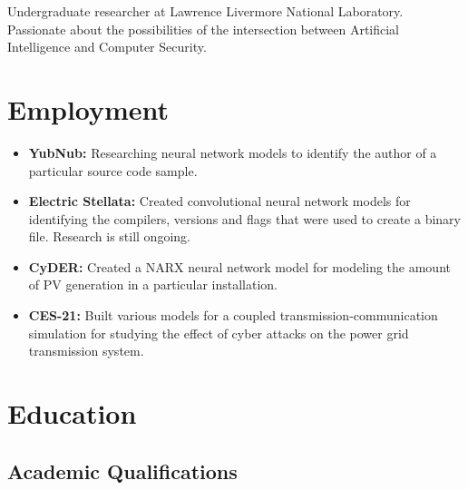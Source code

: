 \documentclass[11pt,a4paper,sans]{moderncv}        %
\begin{document}
\makecvtitle

\small{Undergraduate researcher at Lawrence Livermore National Laboratory. Passionate about the possibilities of the intersection between Artificial Intelligence and Computer Security.}

\section{Employment}
\vspace{6pt}

\vspace{5pt}

\begin{itemize}
	\item \textbf{YubNub:} Researching neural network models to identify the author of a particular source code sample. 

	\item \textbf{Electric Stellata:} Created convolutional neural network models for identifying the compilers, versions and flags that were used to create a binary file. Research is still ongoing.

	\item \textbf{CyDER:} Created a NARX neural network model for modeling the amount of PV generation in a particular installation.
	
	\item \textbf{CES-21:} Built various models for a coupled transmission-communication simulation for studying the effect of cyber attacks on the power grid transmission system.
\end{itemize}

\section{Education}
\vspace{6pt}

\subsection{Academic Qualifications}
\vspace{6pt}
\end{document}
